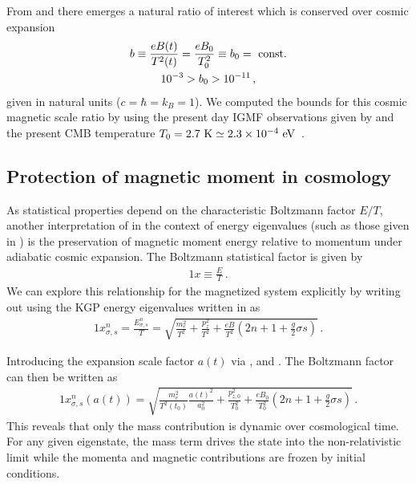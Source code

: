 From  and  there emerges a natural ratio of interest which is conserved over cosmic expansion 
\begin{gather}
 \label{tbscale}
 b \equiv\frac{e{B}(t)}{T^{2}(t)}=\frac{e{B}_{0}}{T_{0}^{2}}\equiv b_0={\rm\ const.}\\
 10^{-3}>b_{0}>10^{-11}\,,
\end{gather}
given in natural units ($c=\hbar=k_{B}=1$). We computed the bounds for this cosmic magnetic scale ratio by using the present day IGMF observations given by  and the present CMB temperature $T_{0}=2.7{\rm\ K}\simeq2.3\times10^{-4}\eV$~\citep{Planck:2018vyg}.

\subsection{Protection of magnetic moment in cosmology}
\label{sec:protection}

As statistical properties depend on the characteristic Boltzmann factor $E/T$, another interpretation of  in the context of energy eigenvalues (such as those given in ) is the preservation of magnetic moment energy relative to momentum under adiabatic cosmic expansion. The Boltzmann statistical factor is given by
\begin{alignat}{1}
    \label{Boltz} x\equiv\frac{E}{T}\,.
\end{alignat}
We can explore this relationship for the magnetized system explicitly by writing out  using the KGP energy eigenvalues written in  as
\begin{alignat}{1}
    \label{XExplicit} x_{\sigma,s}^{n} = \frac{E_{\sigma,s}^{n}}{T} = \sqrt{\frac{m_{e}^{2}}{T^{2}}+\frac{p_{z}^{2}}{T^{2}}+\frac{eB}{T^{2}}\left(2n+1+\frac{g}{2}\sigma s\right)}\,.
\end{alignat}

Introducing the expansion scale factor $a(t)$ via ,  and . The Boltzmann factor can then be written as
\begin{alignat}{1}
    \label{xscale:1} x_{\sigma,s}^{n}(a(t)) = \sqrt{\frac{m_{e}^{2}}{T^{2}(t_{0})}\frac{a(t)^{2}}{a_{0}^{2}}+\frac{p_{z,0}^{2}}{T_{0}^{2}}+\frac{eB_{0}}{T_{0}^{2}}\left(2n+1+\frac{g}{2}\sigma s\right)}\,.
\end{alignat}
This reveals that only the mass contribution is dynamic over cosmological time. For any given eigenstate, the mass term drives the state into the non-relativistic limit while the momenta and magnetic contributions are frozen by initial conditions. 

